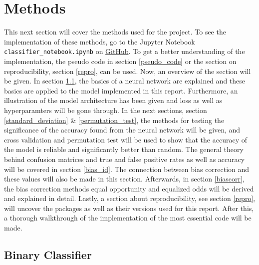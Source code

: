 \documentclass[11pt, fleqn, titlepage]{article}
\begin{document}
	\section{Methods} \label{methods}
	This next section will cover the methods used for the project. To see the implementation of these methods, go to the Jupyter Notebook \texttt{classifier\_notebook.ipynb} on \href{https://github.com/oskarwiese/fagprojekt/tree/master/src}{GitHub}. To get a better understanding of the implementation, the pseudo code in section \ref{pseudo_code} or the section on reproducibility, section \ref{repro}, can be used. Now, an overview of the section will be given. In section \ref{Feed-forward neural}, the basics of a neural network are explained and these basics are applied to the model implemented in this report. Furthermore, an illustration of the model architecture has been given and loss as well as hyperparamters will be gone through. In the next sections, section \ref{standard_deviation} \& \ref{permutation_test}, the methods for testing the significance of the accuracy found from the neural network will be given, and cross validation and permutation test will be used to show that the accuracy of the model is reliable and significantly better than random. The general theory behind confusion matrices and true and false positive rates as well as accuracy will be covered in section \ref{bias_id}. The connection between bias correction and these values will also be made in this section. Afterwards, in section \ref{biascorr}, the bias correction methods equal opportunity and equalized odds will be derived and explained in detail. Lastly, a section about reproducibility, see section \ref{repro}, will uncover the packages as well as their versions used for this report. After this, a thorough walkthrough of the implementation of the most essential code will be made.
	
	\subsection{Binary Classifier}\label{Feed-forward neural}
\end{document}

